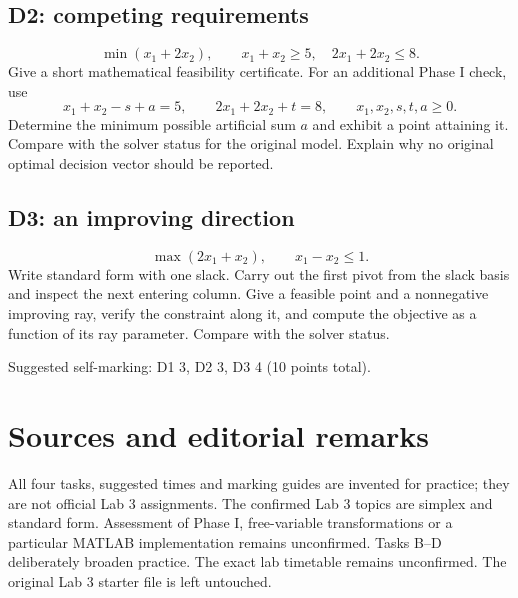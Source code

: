 \documentclass[11pt,a4paper]{article}
\begin{document}
\subsection*{D2: competing requirements}
\[
  \min(x_1+2x_2),\qquad x_1+x_2\geq5,\quad2x_1+2x_2\leq8.
\]
Give a short mathematical feasibility certificate. For an additional Phase I
check, use
\[
  x_1+x_2-s+a=5,\qquad2x_1+2x_2+t=8,
  \qquad x_1,x_2,s,t,a\geq0.
\]
Determine the minimum possible artificial sum $a$ and exhibit a point attaining
it. Compare with the solver status for the original model. Explain why no
original optimal decision vector should be reported.

\subsection*{D3: an improving direction}
\[
  \max(2x_1+x_2),\qquad x_1-x_2\leq1.
\]
Write standard form with one slack. Carry out the first pivot from the slack
basis and inspect the next entering column. Give a feasible point and a
nonnegative improving ray, verify the constraint along it, and compute the
objective as a function of its ray parameter. Compare with the solver status.

Suggested self-marking: D1 3, D2 3, D3 4 (10 points total).

\section*{Sources and editorial remarks}
All four tasks, suggested times and marking guides are invented for practice;
they are not official Lab 3 assignments. The confirmed Lab 3 topics are simplex
and standard form. Assessment of Phase I, free-variable transformations or
a particular MATLAB implementation remains unconfirmed. Tasks B--D deliberately
broaden practice. The exact lab timetable remains unconfirmed. The original
Lab 3 starter file is left untouched.
\end{document}
